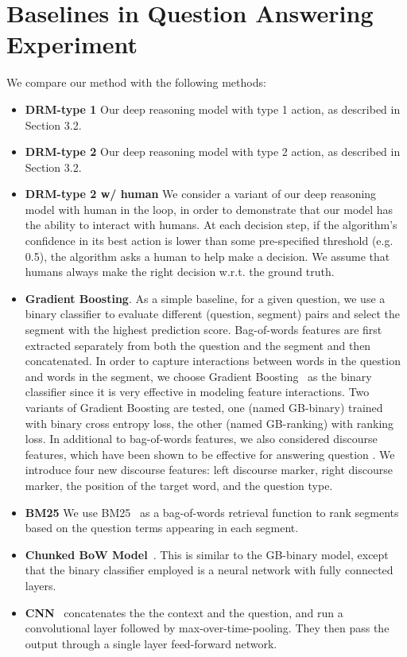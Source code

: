 \chapter{Baselines in Question Answering Experiment} \label{qa_baseline}


We compare our method with the following methods:

\begin{itemize}
\item \textbf{DRM-type 1} Our deep reasoning model with type 1 action, as described in Section 3.2.
\item \textbf{DRM-type 2} Our deep reasoning model with type 2 action, as described in Section 3.2.
\item \textbf{DRM-type 2 w/ human} We consider a variant of our deep reasoning model with human in the loop, in order to demonstrate that our model has the ability to interact with humans. At each decision step, if the algorithm's confidence in its best action is lower than some pre-specified threshold (e.g. 0.5), the algorithm asks a human to help make a decision. We assume that humans always make the right decision w.r.t. the ground truth. 
\end{itemize}

\begin{itemize}
    \item \textbf{Gradient Boosting}. As a simple baseline, for a given question, we use a binary classifier to evaluate  different (question, segment) pairs and select the segment with the highest prediction score. Bag-of-words features are first extracted separately from both the question and the segment and then concatenated. In order to capture interactions between words in the question and words in the segment, we choose Gradient Boosting~\cite{friedman2001greedy2} as the binary classifier since it is very effective in modeling feature interactions. Two variants of Gradient Boosting are tested, one (named GB-binary) trained with binary cross entropy loss, the other (named GB-ranking) with ranking loss. In additional to bag-of-words features, we also considered discourse features, which have been shown to be effective for answering question \cite{DBLP:conf/acl/JansenSC14,DBLP:conf/acl/NarasimhanB15}. We introduce four new discourse features: left discourse marker, right discourse marker, the position of the target word, and the question type.
    \item \textbf{BM25} We use BM25~\cite{DBLP:journals/ftir/RobertsonZ09} as a bag-of-words retrieval function to rank segments based on the question terms appearing in each segment.
    
    \item \textbf{Chunked BoW Model}~\cite{DBLP:conf/acl/ChoiHUPLB17}. This is similar to the GB-binary model, except that the binary classifier employed is a neural network with fully connected layers.
    \item \textbf{CNN}~\cite{DBLP:conf/acl/ChoiHUPLB17}  concatenates
the the context and the question, and run a convolutional layer followed by max-over-time-pooling. They then pass the output through a single layer feed-forward network.
\end{itemize}
